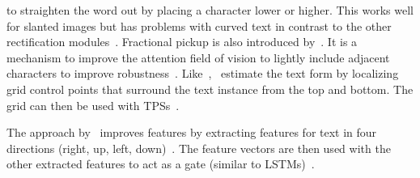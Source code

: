 to straighten the word out by placing a character lower or higher.
This works well for slanted images but has problems with curved text in contrast to the other
rectification modules~\citep{zhan_esir_2019,liu_star-net_2016,long_scene_2021}.
Fractional pickup is also introduced by~\cite{luo_multi-object_2019}.
It is a mechanism to improve the attention field of vision to lightly include adjacent characters
to improve robustness~\citep{luo_multi-object_2019}.
Like~\cite{zhan_esir_2019},~\cite{shi_aster_2019} estimate the text form by localizing
grid control points that surround the text instance from the top and bottom.
The grid can then be used with \acp{TPS}~\citep{shi_aster_2019}.

The approach by~\cite{cheng_aon_2018} improves features by extracting features for text in
four directions (right, up, left, down)~\citep{cheng_aon_2018}.
The feature vectors are then used with the other extracted features to act as a gate (similar to
\acp{LSTM})~\citep{cheng_aon_2018}.

